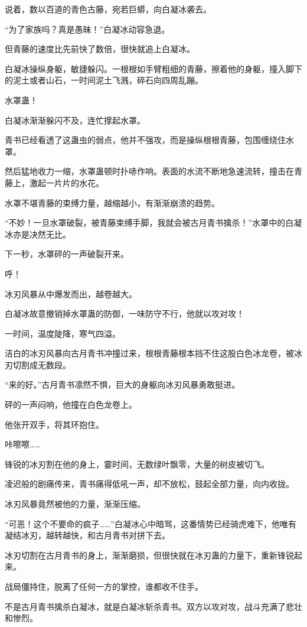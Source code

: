 \begin{this_body}
说着，数以百道的青色古藤，宛若巨蟒，向白凝冰袭去。

“为了家族吗？真是愚昧！”白凝冰动容急退。

但青藤的速度比先前快了数倍，很快就追上白凝冰。

白凝冰操纵身躯，敏捷躲闪。一根根如手臂粗细的青藤，擦着他的身躯，撞入脚下的泥土或者山石，一时间泥土飞溅，碎石向四周乱蹦。

水罩蛊！

白凝冰渐渐躲闪不及，连忙撑起水罩。

青书已经看透了这蛊虫的弱点，他并不强攻，而是操纵根根青藤，包围缠绕住水罩。

然后猛地收力一缩，水罩蛊顿时扑哧作响。表面的水流不断地急速流转，撞击在青藤上，激起一片片的水花。

水罩不堪青藤的束缚力量，越缩越小，有渐渐崩溃的趋势。

“不妙！一旦水罩破裂，被青藤束缚手脚，我就会被古月青书擒杀！”水罩中的白凝冰亦是决然无比。

下一秒，水罩砰的一声破裂开来。

呼！

冰刃风暴从中爆发而出，越卷越大。

白凝冰故意撤销掉水罩蛊的防御，一味防守不行，他就以攻对攻！

一时间，温度陡降，寒气四溢。

洁白的冰刃风暴向古月青书冲撞过来，根根青藤根本挡不住这股白色冰龙卷，被冰刃切割成无数段。

“来的好。”古月青书凛然不惧，巨大的身躯向冰刃风暴勇敢挺进。

砰的一声闷响，他撞在白色龙卷上。

他张开双手，将其环抱住。

咔嚓嚓……

锋锐的冰刃割在他的身上，霎时间，无数绿叶飘零，大量的树皮被切飞。

凌迟般的剧痛传来，青书痛得低吼一声，却不放松，鼓起全部力量，向内收拢。

冰刃风暴竟然被他的力量，渐渐压缩。

“可恶！这个不要命的疯子……”白凝冰心中暗骂，这番情势已经骑虎难下，他唯有凝结冰刃，越转越快，和古月青书对拼下去。

冰刃切割在古月青书的身上，渐渐磨损，但很快就在冰刃蛊的力量下，重新锋锐起来。

战局僵持住，脱离了任何一方的掌控，谁都收不住手。

不是古月青书擒杀白凝冰，就是白凝冰斩杀青书。双方以攻对攻，战斗充满了悲壮和惨烈。

\end{this_body}

